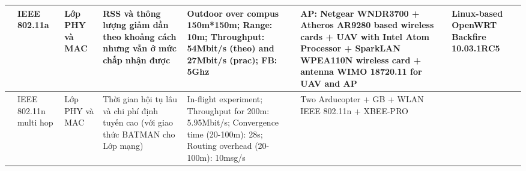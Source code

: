 \documentclass[11pt,openany]{book}
\begin{document}
\begin{landscape}
    \begin{table}[H]
        \centering
        \begin{tabular}{|p{1.5cm}|p{1.7cm}|p{1.3cm}|p{2.9cm}|p{2.7cm}|p{2.3cm}|p{2cm}|}\hline
            [Kuschnig et al., 2012] & IEEE 802.11a           & Lớp PHY và MAC & RSS và thông lượng giảm dần theo khoảng cách nhưng vẫn ở mức chấp nhận được        & Outdoor over compus 150m*150m; Range: 10m; Throughput: 54Mbit/s (theo) and 27Mbit/s (prac); FB: 5Ghz                        & AP: Netgear WNDR3700 + Atheros AR9280 based wireless cards + UAV with Intel Atom Processor + SparkLAN WPEA110N wireless card + antenna WIMO 18720.11 for UAV and AP & Linux-based OpenWRT Backfire 10.03.1RC5 \\\hline
            [Asadpour et al., 2014] & IEEE 802.11n multi hop & Lớp PHY và MAC & Thời gian hội tụ lâu và chi phí định tuyến cao (với giao thức BATMAN cho Lớp mạng) & In-flight experiment; Throughput for 200m: 5.95Mbit/s; Convergence time (20-100m): 28s; Routing overhead (20-100m): 10msg/s & Two Arducopter + GB + WLAN IEEE 802.11n + XBEE-PRO                                                                                                                  &                                         \\\hline
        \end{tabular}
    \end{table}
\end{landscape}
\end{document}
